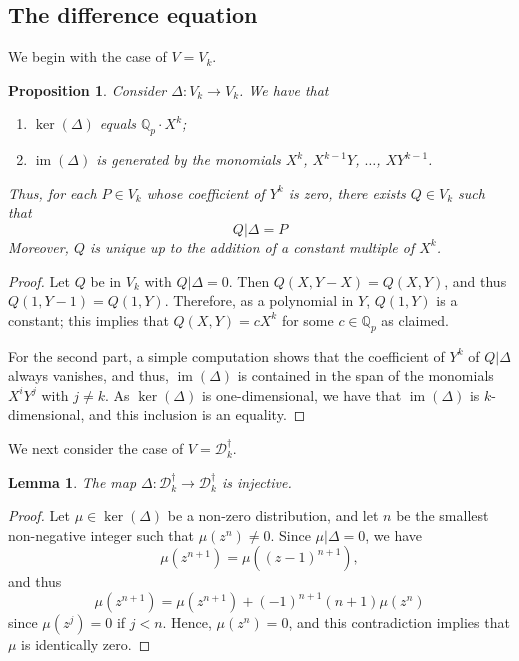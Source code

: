 \documentclass{amsart}
\theoremstyle{plain}
\newtheorem{prop}[thm]{Proposition}
\newtheorem{lemma}[thm]{Lemma}
\theoremstyle{definition}
\newcommand{\D}{{\mathcal D}}
\newcommand{\Q}{{\mathbb Q}}
\newcommand{\Qp}{\Q_p}
\newcommand{\maps}{\rightarrow}
\newcommand{\Dkoc}{\D_k^\dag}
\DeclareMathOperator{\im}{im}
\begin{document}
\subsection{The difference equation}
\label{sec:diffeqn}

We begin with the case of $V = V_k$.

\begin{prop}
\label{prop:Lkkerdelta}
Consider $\Delta:V_k \maps V_k$.  We have that
\begin{enumerate}
\item $\ker(\Delta)$ equals $\Qp \cdot X^k$;
\item $\im(\Delta)$  is generated by the monomials $X^k$, $X^{k-1}Y$, $\dots $, $XY^{k-1}$.
\end{enumerate}
Thus, for each $P \in V_k$ whose coefficient of $Y^k$ is zero, there exists $Q \in V_k$ such that
$$
Q \big| \Delta = P
$$
Moreover, $Q$ is unique up to the addition of a constant multiple of $X^k$.
\end{prop}

\begin{proof}
Let $Q$ be in $V_k$ with $Q \big| \Delta = 0$.  Then $Q(X,Y-X)=Q(X,Y)$, and thus $Q(1,Y-1)=Q(1,Y)$.  Therefore, as a polynomial in $Y$, $Q(1,Y)$ is a constant; this implies that $Q(X,Y) = c X^k$ for some $c \in \Qp$ as claimed.

For the second part, a simple computation shows that the coefficient of $Y^k$ of $Q \big| \Delta$ always vanishes, and thus, $\im(\Delta)$ is contained in the span of the monomials $X^i Y^j$ with $j \neq k$.  As $\ker(\Delta)$ is one-dimensional, we have that $\im(\Delta)$ is $k$-dimensional, and this inclusion is an equality.
\end{proof}

We next consider the case of $V = \Dkoc$.

\begin{lemma}
\label{lem:inj}
The map $\Delta : \Dkoc \maps \Dkoc$ is injective.
\end{lemma}

\begin{proof}
Let $\mu \in \ker(\Delta)$ be a non-zero distribution,
and let $n$ be the smallest non-negative integer such that
$\mu(z^n) \neq 0$.   Since $\mu\big| \Delta = 0$, we have
$$
\mu(z^{n+1}) = \mu((z-1)^{n+1}),
$$
and thus
$$
 \mu(z^{n+1}) = \mu(z^{n+1}) + (-1)^{n+1} (n+1) \mu(z^n)
$$
since $\mu(z^j) = 0$ if $j<n$.
Hence, $\mu(z^n) = 0$, and this contradiction implies that $\mu$ is identically zero.
\end{proof}
\end{document}

